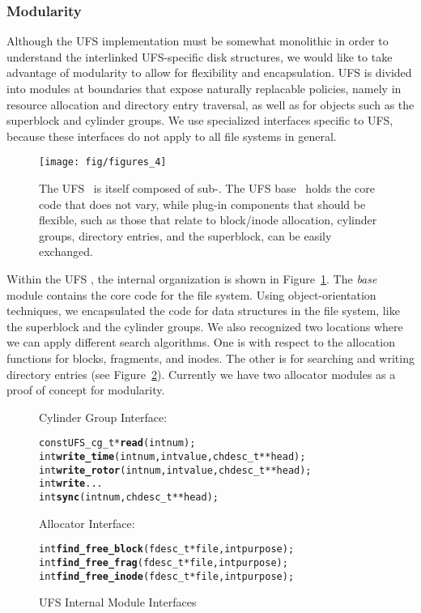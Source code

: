 \subsubsection {Modularity}
Although the UFS implementation must be somewhat monolithic in order to
understand the interlinked UFS-specific disk structures, we would like to take
advantage of modularity to allow for flexibility and encapsulation. UFS is
divided into modules at boundaries that expose naturally replacable policies,
namely in resource allocation and directory entry traversal, as well as for
objects such as the superblock and cylinder groups. We use specialized
interfaces specific to UFS, because these interfaces do not apply to all file
systems in general.

\begin{figure}[htb]
  \centering
  \texttt{[image: fig/figures\_4]}
  \caption{\label{fig:ufsmodules} The UFS \module\ is itself composed of
  sub-\modules. The UFS base \module\ holds the core code that does not
  vary, while plug-in components that should be flexible, such as those that
  relate to block/inode allocation, cylinder groups, directory entries, and the
  superblock, can be easily exchanged.}
\end{figure}


Within the UFS \module, the internal organization is shown in
Figure~\ref{fig:ufsmodules}. The \emph{base} module contains the core code for
the file system. Using object-orientation techniques, we encapsulated the code
for data structures in the file system, like the superblock and the cylinder
groups. We also recognized two locations where we can apply different search
algorithms. One is with respect to the allocation functions for blocks,
fragments, and inodes. The other is for searching and writing directory entries
(see Figure~\ref{fig:moduleinterface}). Currently we have two allocator modules
as a proof of concept for modularity.

\begin{figure}[htb]
Cylinder Group Interface:
\vspace{-0.5\baselineskip}
\begin{scriptsize}
\begin{alltt}
const UFS_cg_t * \textbf{read}(int num);
int \textbf{write_time}(int num, int value, chdesc_t ** head);
int \textbf{write_rotor}(int num, int value, chdesc_t ** head);
int \textbf{write}...
int \textbf{sync}(int num, chdesc_t ** head);
\end{alltt}
\end{scriptsize}

Allocator Interface:
\vspace{-0.5\baselineskip}
\begin{scriptsize}
\begin{alltt}
int \textbf{find_free_block}(fdesc_t * file, int purpose);
int \textbf{find_free_frag}(fdesc_t * file, int purpose);
int \textbf{find_free_inode}(fdesc_t * file, int purpose);
\end{alltt}
\end{scriptsize}
\vspace{-0.5\baselineskip}
\caption{\label{fig:moduleinterface} UFS Internal Module Interfaces}
\end{figure}

